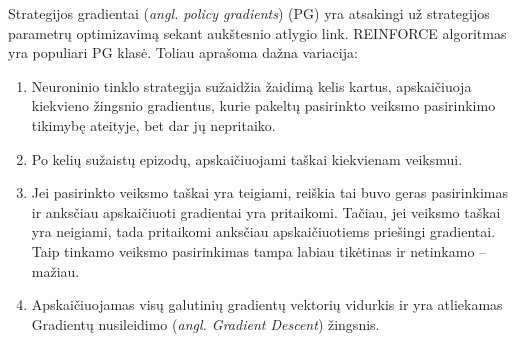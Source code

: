 \documentclass{VUMIFPSbakalaurinis}
\begin{document}
{
	Strategijos gradientai (\textit{angl. policy gradients}) (PG) yra atsakingi už strategijos parametrų optimizavimą sekant aukštesnio atlygio link. REINFORCE algoritmas \cite{williams_1992} yra populiari PG klasė. Toliau aprašoma dažna variacija:
	
	\begin{enumerate}
		\item Neuroninio tinklo strategija sužaidžia žaidimą kelis kartus, apskaičiuoja kiekvieno žingsnio gradientus, kurie pakeltų pasirinkto veiksmo pasirinkimo tikimybę ateityje, bet dar jų nepritaiko.
		\item Po kelių sužaistų epizodų, apskaičiuojami taškai kiekvienam veiksmui.
		\item Jei pasirinkto veiksmo taškai yra teigiami, reiškia tai buvo geras pasirinkimas ir anksčiau apskaičiuoti gradientai yra pritaikomi. Tačiau, jei veiksmo taškai yra neigiami, tada pritaikomi anksčiau apskaičiuotiems priešingi gradientai. Taip tinkamo veiksmo pasirinkimas tampa labiau tikėtinas ir netinkamo -- mažiau.
		\item Apskaičiuojamas visų galutinių gradientų vektorių vidurkis ir yra atliekamas Gradientų nusileidimo (\textit{angl. Gradient Descent}) žingsnis.
	\end{enumerate}
}
\end{document}
